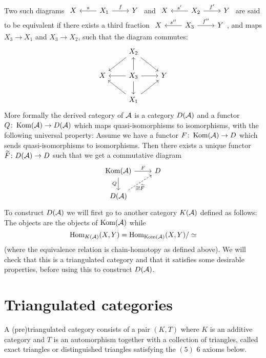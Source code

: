\documentclass[a4paper, UKenglish]{report}
\begin{document}
Two such diagrams $\begin{tikzcd}X & \arrow[l, "s", swap] X_1 \arrow[r, "f"] & Y \end{tikzcd}$ and $\begin{tikzcd}X & \arrow[l, "s'", swap] X_2 \arrow[r, "f'"] & Y \end{tikzcd}$ are said to be equivalent if there exists a third fraction $\begin{tikzcd}X & \arrow[l, "s''", swap] X_3 \arrow[r, "f''"] & Y \end{tikzcd}$, and maps $X_3 \to X_1$ and $X_3 \to X_2$, such that the diagram commutes:
\[
\begin{tikzcd}
  &    X_2 \arrow{dl} \arrow{dr} & \\
  X  & X_3 \arrow{l}  \arrow{r}  \arrow{u} \arrow{d} & Y \\
  &    X_1 \arrow{ul} \arrow{ur} & 
\end{tikzcd} 
\]
More formally the derived category of $\mathcal{A}$ is a category $D(\mathcal{A})$ and a functor $Q \colon \operatorname{Kom}(\mathcal{A}) \to D(\mathcal{A})$ which maps quasi-isomorphisms to isomorphisms, with the following universal property: Assume we have a functor $F \colon \operatorname{Kom} (\mathcal{A}) \to D$ which sends quasi-isomorphisms to isomorphisms. Then there exists a unique functor $\widetilde{F} \colon D(\mathcal{A}) \to D$ such that we get a commutative diagram
\[
    \begin{tikzcd}
        \Kom(\AAA) \arrow[d, "Q"{left}] \ar{r}{F} & D \\
        D(\AAA) \arrow[ur, dashed, "\exists ! \widetilde{F}"{below}] &
    \end{tikzcd}
\]
To construct $D(\mathcal{A})$ we will first go to another category $K(\mathcal{A})$ defined as follows: The objects are the objects of $\operatorname{Kom}(\mathcal{A})$ while 
\[
    \operatorname{Hom}_{K(\mathcal{A})}(X,Y) = \operatorname{Hom}_{\operatorname{Kom}(\mathcal{A})}(X,Y) / \simeq
\]
(where the equivalence relation is chain-homotopy as defined above). We will check that this is a triangulated category and that it satisfies some desirable properties, before using this to construct $D(\mathcal{A})$.

\section{Triangulated categories}

A (pre)triangulated category consists of a pair $(K,T)$ where $K$ is an additive category and $T$ is an automorphism together with a collection of triangles, called exact triangles or distinguished triangles satisfying the $(5)$ $6$ axioms below.
\end{document}
